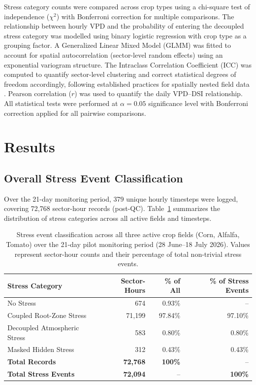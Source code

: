 \documentclass[review,12pt]{elsarticle}
\begin{document}
Stress category counts were compared across crop types using a chi-square test of independence ($\chi^2$) with Bonferroni correction for multiple comparisons. The relationship between hourly VPD and the probability of entering the decoupled stress category was modelled using binary logistic regression with crop type as a grouping factor. A Generalized Linear Mixed Model (GLMM) was fitted to account for spatial autocorrelation (sector-level random effects) using an exponential variogram structure. The Intraclass Correlation Coefficient (ICC) was computed to quantify sector-level clustering and correct statistical degrees of freedom accordingly, following established practices for spatially nested field data \citep{martinez2021neural}. Pearson correlation ($r$) was used to quantify the daily VPD--DSI relationship. All statistical tests were performed at $\alpha = 0.05$ significance level with Bonferroni correction applied for all pairwise comparisons.

\section{Results}
\label{sec:results}

\subsection{Overall Stress Event Classification}
\label{subsec:overall}

Over the 21-day monitoring period, 379 unique hourly timesteps were logged, covering 72,768 sector-hour records (post-QC). Table~\ref{tab:stress_counts} summarizes the distribution of stress categories across all active fields and timesteps.

\begin{table}[H]
\centering
\caption{Stress event classification across all three active crop fields (Corn, Alfalfa, Tomato) over the 21-day pilot monitoring period (28 June–18 July 2026). Values represent sector-hour counts and their percentage of total non-trivial stress events.}
\label{tab:stress_counts}
\begin{tabular}{lrrr}
\toprule
\textbf{Stress Category} & \textbf{Sector-Hours} & \textbf{\% of All} & \textbf{\% of Stress Events} \\
\midrule
No Stress                     & 674  & 0.93\%  & -- \\
Coupled Root-Zone Stress      & 71,199 & 97.84\% & 97.10\% \\
Decoupled Atmospheric Stress  & 583  & 0.80\%  & 0.80\% \\
Masked Hidden Stress          & 312  & 0.43\%  & 0.43\% \\
\midrule
\textbf{Total Records}        & \textbf{72,768} & \textbf{100\%} & -- \\
\textbf{Total Stress Events}  & \textbf{72,094} & -- & \textbf{100\%} \\
\bottomrule
\end{tabular}
\end{table}
\end{document}
